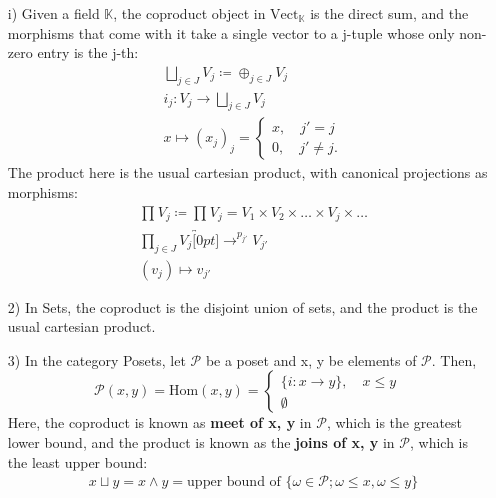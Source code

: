 \documentclass[../category_theory.tex]{subfiles}
\begin{document}
\begin{example}
	\begin{itemize}
		\item[i)] Given a field \(\mathbb{K}\), the coproduct object in \(\mathrm{Vect}_{\mathbb{K}}\) is the direct sum, and the morphisms that come with it take a single vector to a j-tuple whose only non-zero entry is the j-th:
		      \begin{align*}
			       & \bigsqcup_{j\in J}^{}V_{j}\coloneqq \oplus_{j\in J}V_{j} \\
			       & i_{j}:V_{j}\rightarrow \bigsqcup_{j\in J}^{}V_{j}        \\
			       & x\mapsto (x_{j})_{j} = \left\{\begin{array}{ll}
				                                       x,\quad j'=j \\
				                                       0,\quad j'\neq j.
			                                       \end{array}\right.
		      \end{align*}
		      The product here is the usual cartesian product, with canonical projections as morphisms:
		      \begin{align*}
			       & \prod\limits_{}^{}V_{j}\coloneqq \prod\limits_{}^{}V_{j} = V_{1}\times V_{2}\times \dotsc \times V_{j}\times \dotsc \\
			       & \prod\limits_{j\in J}^{}V_{j}\overbracket[0pt]{\longrightarrow}^{p_{j'}}V_{j'}                                      \\
			       & (v_{j})\mapsto v_{j'}
		      \end{align*}
		\item[2)] In Sets, the coproduct is the disjoint union of sets, and the product is the usual cartesian product.
		\item[3)] In the category Posets, let \(\mathcal{P}\) be a poset and x, y be elements of \(\mathcal{P}.\) Then,
		      \[
			      \mathcal{P}(x, y)=\mathrm{Hom}(x, y) = \left\{\begin{array}{ll}
				      \{i:x\rightarrow y\},\quad x\leq y \\
				      \emptyset
			      \end{array}\right.
		      \]
		      Here, the coproduct is known as \textbf{meet of x, y} in \(\mathcal{P}\), which is the greatest lower bound, and the product is known as the \textbf{joins of x, y} in \(\mathcal{P}\), which is the least upper bound:
		      \begin{align*}
			       & x\sqcup y= x\wedge y = \text{upper bound of }\{\omega \in \mathcal{P}; \omega \leq x, \omega \leq y\}  \\

\end{align*}
\end{itemize}
\end{example}
\end{document}
